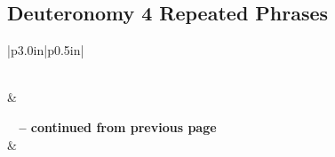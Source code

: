 \subsection{Deuteronomy 4 Repeated Phrases}


\normalsize
 
\begin{center}
\begin{longtable}{|p{3.0in}|p{0.5in}|}
\caption[Deuteronomy 4 Repeated Phrases]{Deuteronomy 4 Repeated Phrases}\label{table:Repeated Phrases Deuteronomy 4} \\
\hline {} &  \\ \hline 
\endfirsthead
 
{{\bfseries \tablename\ \thetable{} -- continued from previous page}} \\  
\hline {} &  \\ \hline 
\endhead
 

\end{longtable}
\end{center}
